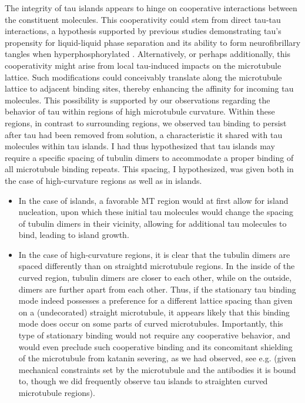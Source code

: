 The integrity of tau islands appears to hinge on cooperative interactions between the constituent molecules. This cooperativity could stem from direct tau-tau interactions, a hypothesis supported by previous studies demonstrating tau's propensity for liquid-liquid phase separation \parencite{HERNANDEZVEGA20172304} and its ability to form neurofibrillary tangles when hyperphosphorylated \parencite{iqbal2016tau}. Alternatively, or perhaps additionally, this cooperativity might arise from local tau-induced impacts on the microtubule lattice. Such modifications could conceivably translate along the microtubule lattice to adjacent binding sites, thereby enhancing the affinity for incoming tau molecules. This possibility is supported by our observations regarding the behavior of tau within regions of high microtubule curvature. Within these regions, in contrast to surrounding regions, we observed tau binding to persist after tau had been removed from solution, a characteristic it shared with tau molecules within tau islands. I had thus hypothesized that tau islands may require a specific spacing of tubulin dimers to accommodate a proper binding of all microtubule binding repeats. This spacing, I hypothesized, was given both in the case of high-curvature regions as well as in islands. 
\begin{itemize}
    \item In the case of islands, a favorable MT region would at first allow for island nucleation, upon which these initial tau molecules would change the spacing of tubulin dimers in their vicinity, allowing for additional tau molecules to bind, leading to island growth.
    \item  In the case of high-curvature regions, it is clear that the tubulin dimers are spaced differently than on straightd microtubule regions. In the inside of the curved region, tubulin dimers are closer to each other, while on the outside, dimers are further apart from each other. Thus, if the stationary tau binding mode indeed possesses a preference for a different lattice spacing than given on a (undecorated) straight microtubule, it appears likely that this binding mode does occur on some parts of curved microtubules. Importantly, this type of stationary binding would not require any cooperative behavior, and would even preclude such cooperative binding and its concomitant shielding of the microtubule from katanin severing, as we had observed, see e.g.  (given mechanical constraints set by the microtubule and the antibodies it is bound to, though we did frequently observe tau islands to straighten curved microtubule regions). 
\end{itemize}
